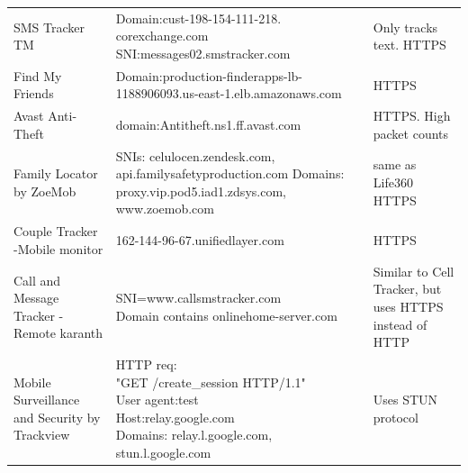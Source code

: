\documentclass[acmtog]{acmart}
\begin{document}
\begin{table}
\begin{tabular}{p{5cm}p{5cm}p{5cm}}
	SMS Tracker TM & \makecell{Domain:cust-198-154-111-218.\\corexchange.com \\ SNI:messages02.smstracker.com} & Only tracks text. HTTPS \\
	
	Find My Friends & Domain:production-finderapps-lb-1188906093.us-east-1.elb.amazonaws.com & HTTPS\\
	
	Avast Anti-Theft & domain:Antitheft.ns1.ff.avast.com& HTTPS. High packet counts\\
	
	Family Locator by ZoeMob & SNIs: celulocen.zendesk.com, api.familysafetyproduction.com
	Domains: proxy.vip.pod5.iad1.zdsys.com, www.zoemob.com & same as Life360
	HTTPS \\
	
	Couple Tracker -Mobile monitor & 162-144-96-67.unifiedlayer.com & HTTPS \\
	
	Call and Message Tracker -Remote karanth & \makecell{SNI=www.callsmstracker.com
	\\Domain contains onlinehome-server.com} & Similar to Cell Tracker, but uses HTTPS instead of HTTP \\
	
	Mobile Surveillance and Security
	by Trackview & \makecell{HTTP req:\\ "GET /create\_session HTTP/1.1"\\ User agent:test \\Host:relay.google.com\\
	Domains: relay.l.google.com,\\ stun.l.google.com} & Uses STUN protocol \\
	
\end{tabular}
\end{table}
\end{document}
